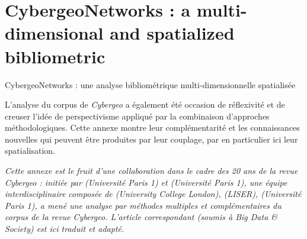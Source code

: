 


\newpage


\section{CybergeoNetworks : a multi-dimensional and spatialized bibliometric}{CybergeoNetworks : une analyse bibliométrique multi-dimensionnelle spatialisée}

\label{app:sec:cybergeonetworks}


L'analyse du corpus de \emph{Cybergeo} a également été occasion de réflexivité et de creuser l'idée de perspectivisme appliqué par la combinaison d'approches méthodologiques. Cette annexe montre leur complémentarité et les connaissances nouvelles qui peuvent être produites par leur couplage, par en particulier ici leur spatialisation.


\stars


\textit{Cette annexe est le fruit d'une collaboration dans le cadre des 20 ans de la revue Cybergeo : initiée par  (Université Paris 1) et  (Université Paris 1), une équipe interdisciplinaire composée de  (University College London),  (LISER),  (Université Paris 1), a mené une analyse par méthodes multiples et complémentaires du corpus de la revue Cybergeo. L'article correspondant (soumis à Big Data \& Society) est ici traduit et adapté.}


\stars



